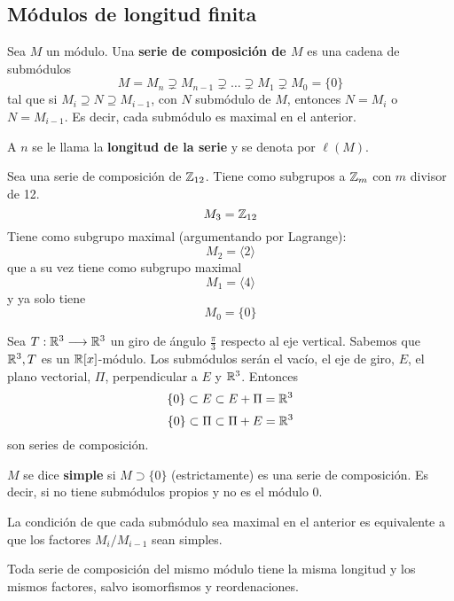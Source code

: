 \subsection{Módulos de longitud finita}

\begin{df}
  Sea \(M\) un módulo. Una \textbf{serie de composición de \(M\)}
  es una cadena de submódulos
  \[
    M=M_n\supsetneq M_{n-1}\supsetneq\ldots\supsetneq M_1
    \supsetneq M_0=\{0\}
  \]
  tal que si \(M_i\supseteq N\supseteq M_{i-1}\), con \(N\) submódulo de \(M\),
  entonces \(N=M_i\) o \(N=M_{i-1}\). Es decir, cada submódulo es maximal
  en el anterior.

  A \(n\) se le llama la \textbf{longitud de la serie} y se denota por \(\ell(M)\).
\end{df}

\begin{ejemplo}
  Sea una serie de composición de \(\mathbb{Z}_{12}\). Tiene como subgrupos
  a \(\mathbb{Z}_m\) con \(m\) divisor de 12.
  \[
    M_3=\mathbb{Z}_{12}
  \]
  Tiene como subgrupo maximal (argumentando por Lagrange):
  \[
    M_2=\langle 2 \rangle
  \]
  que a su vez tiene como subgrupo maximal
  \[
    M_1=\langle 4\rangle
  \]
  y ya solo tiene
  \[
    M_0=\{0\}
  \]
\end{ejemplo}

\begin{ejemplo}
  Sea \(T: \mathbb{R}^3 \longrightarrow \mathbb{R}^3\) un giro de ángulo \(\frac{\pi}{3}\) respecto al eje
  vertical. Sabemos que \(\mathbb{R}^3, T\) es un \(\mathbb{R}[x]\)-módulo. Los submódulos serán el vacío,
  el eje de giro, \(E\), el plano vectorial, \(\Pi\), perpendicular a \(E\) y \(\mathbb{R}^3\).
  Entonces
  \[\{0\} \subset E \subset E + \Pi = \mathbb{R}^3\]
  \[\{0\} \subset \Pi \subset \Pi + E = \mathbb{R}^3\]
  son series de composición. 
\end{ejemplo}

\begin{df}
  \(M\) se dice \textbf{simple} si \(M\supset\{0\}\) (estrictamente) es una serie de
  composición.
  Es decir, si no tiene submódulos propios y no es el módulo 0.
\end{df}

\begin{prop}
  La condición de que cada submódulo sea maximal en el anterior es equivalente
  a que los factores \(M_i/M_{i-1}\) sean simples.
\end{prop}

\begin{teo}
  Toda serie de composición del mismo módulo tiene la misma longitud
  y los mismos factores, salvo isomorfismos y reordenaciones.
\end{teo}

